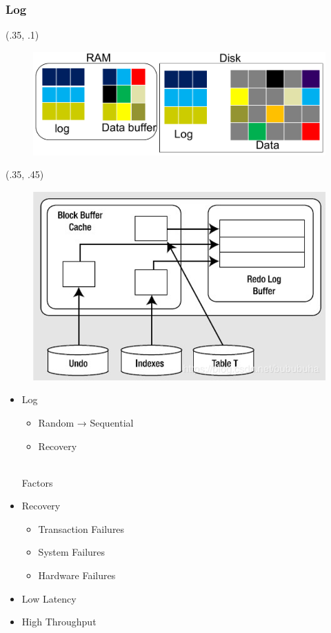 \begin{frame}[fragile]
	\frametitle{Log}
	\begin{textblock*}{.75\paperwidth}(.35\paperwidth, .1\paperheight) %
		\begin{figure}
			\includegraphics[width=.7\linewidth]{figs/dbfile-log2.pdf}
		\end{figure}
	\end{textblock*}
	\begin{textblock*}{.75\paperwidth}(.35\paperwidth, .45\paperheight) %
		\begin{figure}
			\includegraphics[width=.45\linewidth]{figs/dbfile-log3.png}
		\end{figure}
	\end{textblock*}
	\begin{itemize}
		\item Log
		\begin{itemize}
			\item Random → Sequential
			\item Recovery
		\end{itemize}
		\pause
		~\\
		\noindent Factors
		\item Recovery
		\begin{itemize}
			\item Transaction Failures
			\item System Failures
			\item Hardware Failures
		\end{itemize}
		\item Low Latency
		\item High Throughput
	\end{itemize}
\end{frame}

